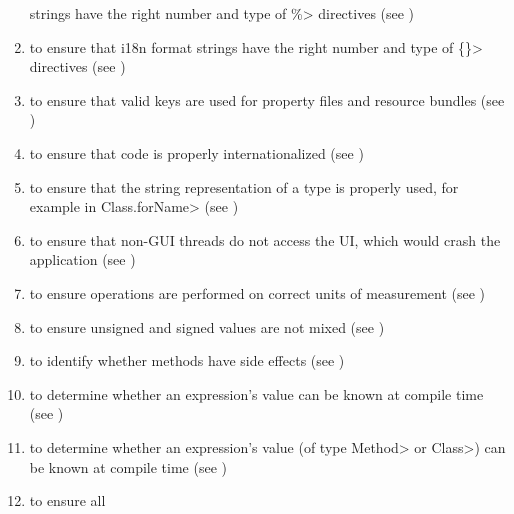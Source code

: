 \begin{enumerate}
  strings have the right number and type of \<\%> directives (see
  )
\item
  to ensure that i18n format strings have the right number and type of
  \<\{\}> directives (see )
\item
   to ensure that valid
  keys are used for property files and resource bundles (see
  )
\item
   to
  ensure that code is properly internationalized (see
  )
\item
   to ensure that the
  string representation of a type is properly used, for example in
  \<Class.forName> (see )
\item
   to ensure that non-GUI
  threads do not access the UI, which would crash the application
  (see )
\item
   to ensure operations are
  performed on correct units of measurement
  (see )
\item
   to
  ensure unsigned and signed values are not mixed
  (see )
\item
   to identify whether
  methods have side effects (see )
\item
   to determine
  whether an expression's value can be known at compile time
  (see )
\item
   to determine
  whether an expression's value (of type \<Method> or \<Class>) can be known at compile time
  (see )
\item
   to ensure all

\end{enumerate}
